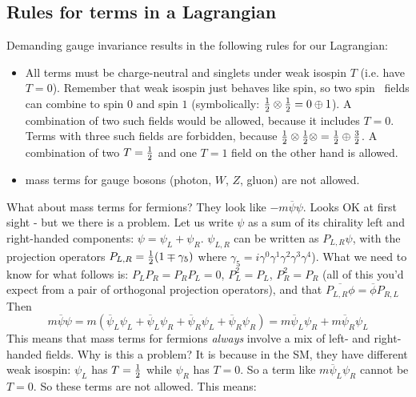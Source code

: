 \subsection{Rules for terms in a Lagrangian}
Demanding gauge invariance results in the following rules for our Lagrangian:
\begin{itemize}
\item All terms must be charge-neutral and singlets under weak isospin $T$ (i.e. have $T=0$). Remember that weak isospin just behaves like spin, so two spin \half\ fields can combine to spin $0$ and spin $1$ (symbolically: $\frac{1}{2} \otimes \frac{1}{2} = 0 \oplus 1$). A combination of two such fields would be allowed, because it includes $T=0$. 
Terms with three such fields are forbidden, because $\frac{1}{2} \otimes \frac{1}{2} \otimes = \frac{1}{2} \oplus \frac{3}{2}$. A combination of two $T=\frac{1}{2}$ and one $T=1$ field on the other hand is allowed.
\item mass terms for gauge bosons (photon, $W$, $Z$, gluon) are not allowed.
\end{itemize}
What about mass terms for fermions? They look like $-m \overline{\psi}\psi$. Looks OK at first sight - but we there is a problem. Let us write $\psi$ as a sum of its chirality left and right-handed components: $\psi = \psi_L + \psi_R$. $\psi_{L,R}$ can be written as $P_{L,R}\psi$, with the projection operators $P_{L,R} = \frac{1}{2}(1 \mp \gamma_5)$ where $\gamma_5 = i\gamma^0\gamma^1\gamma^2\gamma^3\gamma^4$). What we need to know for what follows is: $P_L P_R=P_RP_L = 0$, $P_L^2 = P_L$, $P_R^2=P_R$ (all of this you'd expect from a pair of orthogonal projection operators), and that $\overline{P_{L,R}\phi} = \overline{\phi} P_{R,L}$
Then
\begin{equation}
m \overline{\psi}\psi = m\left(
\overline{\psi}_L\psi_L + \overline{\psi}_L\psi_R + \overline{\psi}_R\psi_L + \overline{\psi}_R\psi_R\right)
=
m \overline{\psi}_L\psi_R + m\overline{\psi}_R\psi_L
\end{equation}
%
This means that mass terms for fermions \emph{always} involve a mix of left- and right-handed fields.
%
Why is this a problem? It is because in the SM, they have different weak isospin: $\psi_L$ has $T=\frac{1}{2}$ while $\psi_R$ has $T=0$. So a term like $m \overline{\psi}_L\psi_R$ cannot be $T=0$.
So these terms are not allowed. This means:
\\\\

